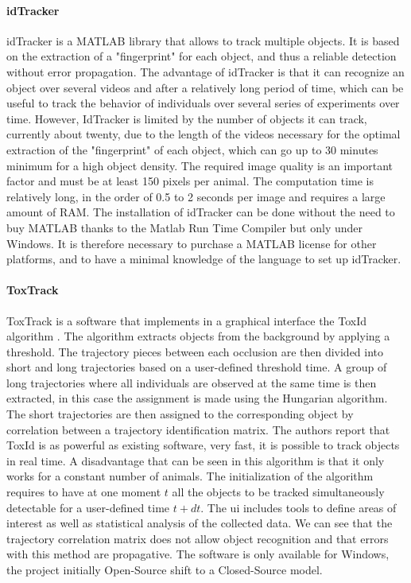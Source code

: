     \paragraph{idTracker}
    idTracker \cite{perez2014idtracker} is a MATLAB library that allows to track multiple objects. It is based on the extraction of a "fingerprint" for each object, and thus a reliable detection without error propagation. The advantage of idTracker is that it can recognize an object over several videos and after a relatively long period of time, which can be useful to track the behavior of individuals over several series of experiments over time. However, IdTracker is limited by the number of objects it can track, currently about twenty, due to the length of the videos necessary for the optimal extraction of the "fingerprint" of each object, which can go up to 30 minutes minimum for a high object density. The required image quality is an important factor and must be at least 150 pixels per animal. The computation time is relatively long, in the order of 0.5 to 2 seconds per image and requires a large amount of RAM. The installation of idTracker can be done without the need to buy MATLAB thanks to the Matlab Run Time Compiler but only under Windows. It is therefore necessary to purchase a MATLAB license for other platforms, and to have a minimal knowledge of the language to set up idTracker.
    \paragraph{ToxTrack}
    ToxTrack \cite{rodriguez2018toxtrac} is a software that implements in a graphical interface the ToxId algorithm \cite{rodriguez2017toxid}. The algorithm extracts objects from the background by applying a threshold. The trajectory pieces between each occlusion are then divided into short and long trajectories based on a user-defined threshold time. A group of long trajectories where all individuals are observed at the same time is then extracted, in this case the assignment is made using the Hungarian algorithm. The short trajectories are then assigned to the corresponding object by correlation between a trajectory identification matrix.
    The authors report that ToxId is as powerful as existing software, very fast, it is possible to track objects in real time. A disadvantage that can be seen in this algorithm is that it only works for a constant number of animals. The initialization of the algorithm requires to have at one moment $t$ all the objects to be tracked simultaneously detectable for a user-defined time $t+dt$. The ui includes tools to define areas of interest as well as statistical analysis of the collected data. We can see that the trajectory correlation matrix does not allow object recognition and that errors with this method are propagative. The software is only available for Windows, the project initially Open-Source shift to a Closed-Source model.
